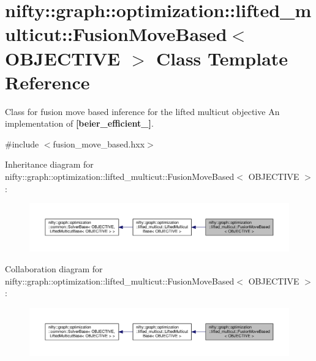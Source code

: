 \hypertarget{classnifty_1_1graph_1_1optimization_1_1lifted__multicut_1_1FusionMoveBased}{}\section{nifty\+:\+:graph\+:\+:optimization\+:\+:lifted\+\_\+multicut\+:\+:Fusion\+Move\+Based$<$ O\+B\+J\+E\+C\+T\+I\+V\+E $>$ Class Template Reference}
\label{classnifty_1_1graph_1_1optimization_1_1lifted__multicut_1_1FusionMoveBased}


Class for fusion move based inference for the lifted multicut objective An implementation of {\bfseries [beier\+\_\+efficient\+\_]}.  




{\ttfamily \#include $<$fusion\+\_\+move\+\_\+based.\+hxx$>$}



Inheritance diagram for nifty\+:\+:graph\+:\+:optimization\+:\+:lifted\+\_\+multicut\+:\+:Fusion\+Move\+Based$<$ O\+B\+J\+E\+C\+T\+I\+V\+E $>$\+:\nopagebreak
\begin{figure}[H]
\begin{center}
\leavevmode
\includegraphics[width=350pt]{classnifty_1_1graph_1_1optimization_1_1lifted__multicut_1_1FusionMoveBased__inherit__graph}
\end{center}
\end{figure}


Collaboration diagram for nifty\+:\+:graph\+:\+:optimization\+:\+:lifted\+\_\+multicut\+:\+:Fusion\+Move\+Based$<$ O\+B\+J\+E\+C\+T\+I\+V\+E $>$\+:\nopagebreak
\begin{figure}[H]
\begin{center}
\leavevmode
\includegraphics[width=350pt]{classnifty_1_1graph_1_1optimization_1_1lifted__multicut_1_1FusionMoveBased__coll__graph}
\end{center}
\end{figure}
